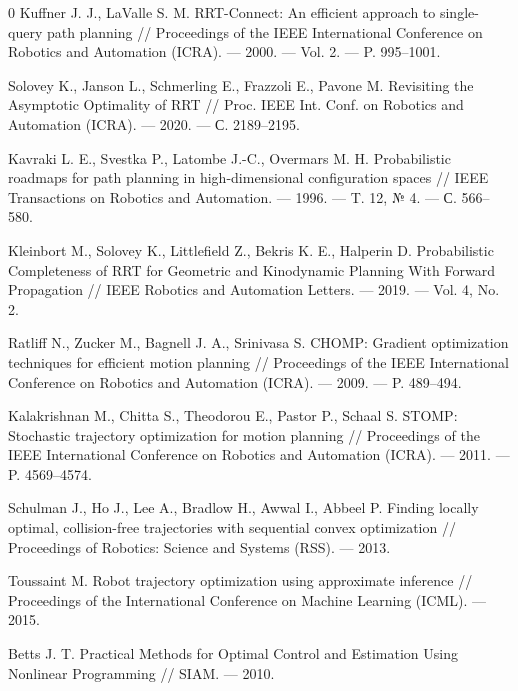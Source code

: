 \documentclass[a4paper,12pt]{extarticle}
\begin{document}
\begin{thebibliography}{0}
\hypertarget{kuffner2000}{}
Kuffner J. J., LaValle S. M.
RRT-Connect: An efficient approach to single-query path planning //
Proceedings of the IEEE International Conference on Robotics and
Automation (ICRA). — 2000. — Vol. 2. — P. 995--1001.

\hypertarget{solovey2020}{}
Solovey K., Janson L., Schmerling E., Frazzoli E., Pavone M.
Revisiting the Asymptotic Optimality of RRT //
Proc. IEEE Int. Conf. on Robotics and Automation (ICRA). — 2020. —
С. 2189--2195.

\hypertarget{kavraki1996}{}
Kavraki L. E., Svestka P., Latombe J.-C., Overmars M. H.
Probabilistic roadmaps for path planning in high-dimensional
configuration spaces //
IEEE Transactions on Robotics and Automation. — 1996. —
T. 12, № 4. — С. 566--580.

\hypertarget{kleinbort2019}{}
Kleinbort M., Solovey K., Littlefield Z., Bekris K. E., Halperin D.
Probabilistic Completeness of RRT for Geometric and Kinodynamic
Planning With Forward Propagation //
IEEE Robotics and Automation Letters. — 2019. —
Vol. 4, No. 2.

\hypertarget{ratliff2009}{}
Ratliff N., Zucker M., Bagnell J. A., Srinivasa S.
CHOMP: Gradient optimization techniques for efficient motion planning //
Proceedings of the IEEE International Conference on Robotics and
Automation (ICRA). — 2009. — P. 489--494.

\hypertarget{kalakrishnan2011}{}
Kalakrishnan M., Chitta S., Theodorou E., Pastor P., Schaal S.
STOMP: Stochastic trajectory optimization for motion planning //
Proceedings of the IEEE International Conference on Robotics and
Automation (ICRA). — 2011. — P. 4569--4574.

\hypertarget{schulman2013}{}
Schulman J., Ho J., Lee A., Bradlow H., Awwal I., Abbeel P.
Finding locally optimal, collision-free trajectories with sequential
convex optimization //
Proceedings of Robotics: Science and Systems (RSS). — 2013.

\hypertarget{toussaint2015}{}
Toussaint M.
Robot trajectory optimization using approximate inference //
Proceedings of the International Conference on Machine Learning (ICML). — 2015.

\hypertarget{betts2010}{}
Betts J. T.
Practical Methods for Optimal Control and Estimation Using Nonlinear
Programming //
SIAM. — 2010.


\end{thebibliography}
\end{document}
